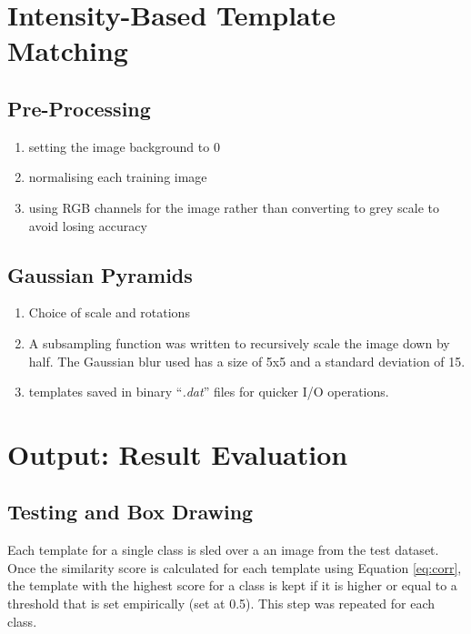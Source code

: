 \documentclass[a4paper,11pt,twocolumn]{article}
\begin{document}

\section{Intensity-Based Template Matching}

\subsection{Pre-Processing}

\begin{enumerate}
    \item setting the image background to 0
    \item normalising each training image
    \item using RGB channels for the image rather than converting to grey scale to avoid losing accuracy
\end{enumerate}

\subsection{Gaussian Pyramids}

\begin{enumerate}
    \item Choice of scale and rotations
    \item A subsampling function was written to recursively scale the image down by half. The Gaussian blur used has a size of 5x5 and a standard deviation of 15. 
    \item templates saved in binary ``\textit{.dat}'' files for quicker I/O operations.
\end{enumerate}

\section{Output: Result Evaluation}

\subsection{Testing and Box Drawing}

Each template for a single class is sled over a an image from the test dataset. Once the similarity score is calculated for each template using Equation \ref{eq:corr}, the template with the highest score for a class is kept if it is higher or equal to a threshold that is set empirically (set at 0.5). This step was repeated for each class.\\
\end{document}
